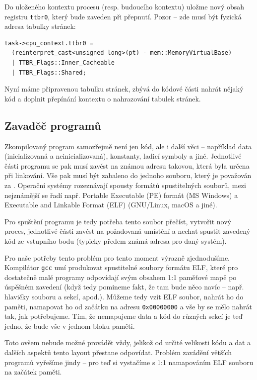 \documentclass{article}
\begin{document}
Do uloženého kontextu procesu (resp. budoucího kontextu) uložme nový obsah registru {\tt ttbr0}, který bude zaveden při přepnutí. Pozor -- zde musí být fyzická adresa tabulky stránek:
\begin{lstlisting}
task->cpu_context.ttbr0 =
  (reinterpret_cast<unsigned long>(pt) - mem::MemoryVirtualBase)
  | TTBR_Flags::Inner_Cacheable
  | TTBR_Flags::Shared;
\end{lstlisting} 

Nyní máme připravenou tabulku stránek, zbývá do kódové části nahrát nějaký kód a doplnit přepínání kontextu o nahrazování tabulek stránek.

\subsection{Zavaděč programů}

Zkompilovaný program samozřejmě není jen kód, ale i další věci -- například data (inicializovaná a neinicializovaná), konstanty, ladicí symboly a jiné. Jednotlivé části programu se pak musí zavést na známou adresu takovou, která byla určena při linkování. Vše pak musí být zabaleno do jednoho souboru, který je považován za . Operační systémy rozeznávají spousty formátů spustitelných souborů, mezi nejznámější se řadí např. Portable Executable (PE) formát (MS Windows) a Executable and Linkable Format (ELF) (GNU/Linux, macOS a jiné).

Pro spuštění programu je tedy potřeba tento soubor přečíst, vytvořit nový proces, jednotlivé části zavést na požadovaná umístění a nechat spustit zavedený kód ze vstupního bodu (typicky předem známá adresa pro daný systém).

Pro naše potřeby tento problém pro tento moment výrazně zjednodušíme. Kompilátor {\tt gcc} umí produkovat spustitelné soubory formátu ELF, které pro dostatečně malé programy odpovídají svým obsahem 1:1 paměťové mapě po úspěšném zavedení (když tedy pomineme fakt, že tam bude něco navíc -- např. hlavičky souboru a sekcí, apod.). Můžeme tedy vzít ELF soubor, nahrát ho do paměti, namapovat ho od začátku na adresu {\tt 0x00000000} a vše by se mělo nahrát tak, jak potřebujeme. Tím, že nemapujeme data a kód do různých sekcí je teď jedno, že bude vše v jednom bloku paměti.

Toto ovšem nebude možné provádět vždy, jelikož od určité velikosti kódu a dat a dalších aspektů tento layout přestane odpovídat. Problém zavádění větších programů vyřešíme jindy -- pro teď si vystačíme s 1:1 namapováním ELF souboru na začátek paměti.
\end{document}
